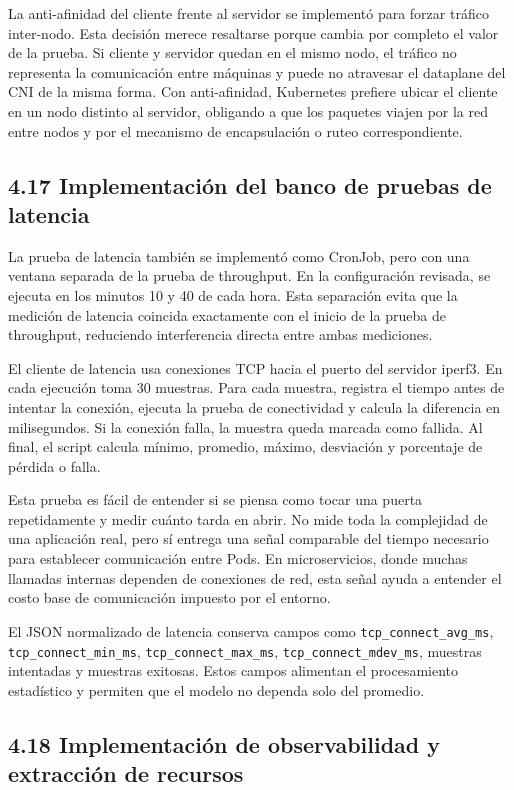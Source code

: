 La anti-afinidad del cliente frente al servidor se implementó para forzar tráfico inter-nodo. Esta decisión merece resaltarse porque cambia por completo el valor de la prueba. Si cliente y servidor quedan en el mismo nodo, el tráfico no representa la comunicación entre máquinas y puede no atravesar el dataplane del CNI de la misma forma. Con anti-afinidad, Kubernetes prefiere ubicar el cliente en un nodo distinto al servidor, obligando a que los paquetes viajen por la red entre nodos y por el mecanismo de encapsulación o ruteo correspondiente.

\subsection{4.17 Implementación del banco de pruebas de latencia}

La prueba de latencia también se implementó como CronJob, pero con una ventana separada de la prueba de throughput. En la configuración revisada, se ejecuta en los minutos 10 y 40 de cada hora. Esta separación evita que la medición de latencia coincida exactamente con el inicio de la prueba de throughput, reduciendo interferencia directa entre ambas mediciones.

El cliente de latencia usa conexiones TCP hacia el puerto del servidor iperf3. En cada ejecución toma 30 muestras. Para cada muestra, registra el tiempo antes de intentar la conexión, ejecuta la prueba de conectividad y calcula la diferencia en milisegundos. Si la conexión falla, la muestra queda marcada como fallida. Al final, el script calcula mínimo, promedio, máximo, desviación y porcentaje de pérdida o falla.

Esta prueba es fácil de entender si se piensa como tocar una puerta repetidamente y medir cuánto tarda en abrir. No mide toda la complejidad de una aplicación real, pero sí entrega una señal comparable del tiempo necesario para establecer comunicación entre Pods. En microservicios, donde muchas llamadas internas dependen de conexiones de red, esta señal ayuda a entender el costo base de comunicación impuesto por el entorno.

El JSON normalizado de latencia conserva campos como \texttt{tcp\_connect\_avg\_ms}, \texttt{tcp\_connect\_min\_ms}, \texttt{tcp\_connect\_max\_ms}, \texttt{tcp\_connect\_mdev\_ms}, muestras intentadas y muestras exitosas. Estos campos alimentan el procesamiento estadístico y permiten que el modelo no dependa solo del promedio.

\subsection{4.18 Implementación de observabilidad y extracción de recursos}

